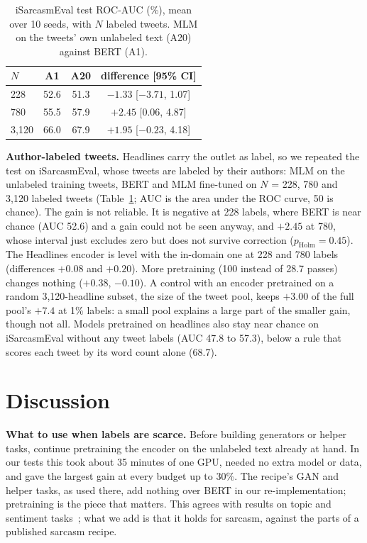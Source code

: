 \documentclass[conference]{IEEEtran}
\newcommand{\A}[1]{\textsf{#1}}                         %
\begin{document}
\begin{table}[t]
\centering
\caption{iSarcasmEval test ROC-AUC (\%), mean over 10 seeds, with $N$ labeled tweets. MLM on the tweets' own unlabeled text (\A{A20}) against BERT (\A{A1}).}
\label{tab:isarc}
\footnotesize
\setlength{\tabcolsep}{5pt}
\begin{tabular}{lccc}
\toprule
$N$ & \A{A1} & \A{A20} & difference [95\% CI] \\
\midrule
228   & 52.6 & 51.3 & $-1.33$ [$-3.71$, 1.07] \\
780   & 55.5 & 57.9 & $+2.45$ [0.06, 4.87] \\
3,120 & 66.0 & 67.9 & $+1.95$ [$-0.23$, 4.18] \\
\bottomrule
\end{tabular}
\end{table}

\textbf{Author-labeled tweets.} Headlines carry the outlet as label, so we repeated the test on iSarcasmEval, whose tweets are labeled by their authors: MLM on the unlabeled training tweets, BERT and MLM fine-tuned on $N$ = 228, 780 and 3,120 labeled tweets (Table~\ref{tab:isarc}; AUC is the area under the ROC curve, 50 is chance). The gain is not reliable. It is negative at 228 labels, where BERT is near chance (AUC 52.6) and a gain could not be seen anyway, and $+2.45$ at 780, whose interval just excludes zero but does not survive correction ($p_{\mathrm{Holm}} = 0.45$). The Headlines encoder is level with the in-domain one at 228 and 780 labels (differences $+0.08$ and $+0.20$). More pretraining (100 instead of 28.7 passes) changes nothing ($+0.38$, $-0.10$). A control with an encoder pretrained on a random 3,120-headline subset, the size of the tweet pool, keeps $+3.00$ of the full pool's $+7.4$ at 1\% labels: a small pool explains a large part of the smaller gain, though not all. Models pretrained on headlines also stay near chance on iSarcasmEval without any tweet labels (AUC 47.8 to 57.3), below a rule that scores each tweet by its word count alone (68.7).

\section{Discussion}

\textbf{What to use when labels are scarce.} Before building generators or helper tasks, continue pretraining the encoder on the unlabeled text already at hand. In our tests this took about 35 minutes of one GPU, needed no extra model or data, and gave the largest gain at every budget up to 30\%. The recipe's GAN and helper tasks, as used there, add nothing over BERT in our re-implementation; pretraining is the piece that matters. This agrees with results on topic and sentiment tasks~\cite{gururangan2020dont,shi2023rethinking,li2021tapt}; what we add is that it holds for sarcasm, against the parts of a published sarcasm recipe.
\end{document}
